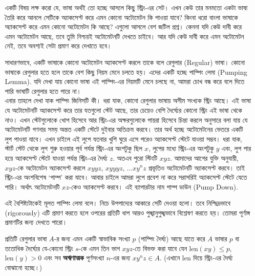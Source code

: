 একটি বিষয় লক্ষ করো যে, ভাষা অর্থই তো হচ্ছে আসলে কিছু স্ট্রিং-এর সেট। এখন কেউ তার মনমতো একটা ভাষা তৈরি করে আনলে সেটিকে অ্যাকসেপ্ট করে এমন কোনো অটোমেটন কি পাওয়া যাবে? কিংবা ধরো বাংলা ভাষাকে অ্যাকসেপ্ট করে এমন কোনো অটোমেটন কি আছে? এগুলো আসলে বেশ জটিল প্রশ্ন। কেননা যদি কেউ দাবী করে এমন অটোমেটন আছে, তবে তুমি নিশ্চয়ই অটোমেটনটি দেখতে চাইবে। আর যদি কেউ দাবী করে এমন অটোমেটন নেই, তবে অবশ্যই সেটা প্রমাণ করে দেখাতে হবে। 

সাধারণভাবে, একটি ভাষাকে কোনো অটোমেটন অ্যাকসেপ্ট করলে তাকে বলে রেগুলার (Regular) ভাষা। কোনো ভাষাকে রেগুলার হতে হলে তাকে বেশ কিছু নিয়ম মেনে চলতে হয়। এদের একটি হচ্ছে পাম্পিং লেমা (Pumping Lemma). যদি দেখা যায় কোনো ভাষা এই পাম্পিং-এর নিয়মটি মেনে চলছে না, আমরা চোখ বন্ধ করে বলে দিতে পারি ভাষাটি রেগুলার হতে পারে না।\\[2pt]
এবার তাহলে দেখা যাক পাম্পিং জিনিসটি কী। ধরা যাক, কোনো রেগুলার ভাষায় অসীম সংখ্যক স্ট্রিং আছে। এই ভাষা যে অটোমেটনটি অ্যাকসেপ্ট করে তার যতগুলো স্টেট আছে, তার চেয়েও বেশি দৈর্ঘ্যের কোনো স্ট্রিং এই ভাষা থেকে নাও। এখন স্টেটগুলোকে খোপ হিসেবে আর স্ট্রিং-এর অক্ষরগুলোকে পায়রা হিসেবে চিন্তা করলে \phpname{} অনুসারে বলা যায় যে অটোমেটনটি গণনার সময় অন্তত একটি স্টেটে দুইবার অতিক্রম করবে। তার অর্থ হচ্ছে অটোমেটনের ভেতরে একটি লুপ পাওয়া যাবে। এখন চাইলে এই লুপে যতবার খুশি ঘুরে এসে পরেও অ্যাকসেপ্ট স্টেটে যাওয়া সম্ভব। ধরা যাক, স্টার্ট স্টেট থেকে লুপ শুরু হওয়ার পূর্ব পর্যন্ত স্ট্রিং-এর অংশটুকু ছিল $x$, লুপের মধ্যে স্ট্রিং-এর অংশটুকু $y$ এবং, লুপ পার হয়ে অ্যাকসেপ্ট স্টেটে যাওয়া পর্যন্ত স্ট্রিং-এর দৈর্ঘ্য $z$. অতএব পুরো স্টিংটি $xyz$. আমাদের আগের যুক্তি অনুযায়ী, $xyz$-কে অটোমেটন অ্যাকসেপ্ট করলে $xyyz$, $xyyyz$, $\ldots xy^nz$ প্রভৃতিও অটোমেটনটি অ্যাকসেপ্ট করবে। তাই স্ট্রিং-এর অংশবিশেষ `পাম্প' করা যাবে। আবার চাইলে আমরা লুপে প্রবেশ না করে সরাসরিই অ্যাকসেপ্ট স্টেটে যেতে পারি। অর্থাৎ অটোমেটনটি $xz$-কেও অ্যাকসেপ্ট করবে। এই ব্যাপারটার নাম পাম্প ডাউন (Pump Down). 

এই বৈশিষ্ট্যটাকেই মূলত পাম্পিং লেমা বলে। নিচে উপপাদ্যের আকারে সেটি দেওয়া হলো। তবে নিশ্ছিদ্রভাবে (rigorously) এটি প্রমাণ করতে হলে ওপরের প্রতিটি ধাপ আরও পুঙ্খানুপুঙ্খভাবে বিশ্লেষণ করতে হয়। তোমরা পূর্ণাঙ্গ প্রমাণটির জন্য \cite{sipser13} দেখতে পারো।

\begin{theorem}[পাম্পিং লেমা]
	প্রতিটি রেগুলার ভাষা $A$-র জন্য এমন একটি স্বাভাবিক সংখ্যা $p$ (পাম্পিং দৈর্ঘ্য) আছে যাতে করে $A$ ভাষার $p$ বা ততোধিক দৈর্ঘ্যের যে-কোনো স্ট্রিং $s$-কে এমন তিন ভাগ $xyz$-তে বিভক্ত করা যাবে যেন $\text{len}(xy)\leq p$, $\text{len}(y)>0$ এবং সব \textbf{অঋণাত্মক} পূর্ণসংখ্যা $n$-এর জন্য $xy^nz\in A$. (এখানে len দিয়ে স্ট্রিং-এর দৈর্ঘ্য বোঝানো হচ্ছে।)
\end{theorem}

